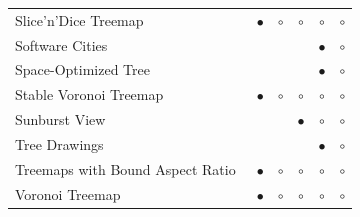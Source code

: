 \documentclass[a4paper,twoside]{article}
\newcommand*\OK{$\circ$}
\newcommand*\OKbf{$\bullet$}
\begin{document}
\begin{table}[b]
\begin{tabularx}{\linewidth}{@{}X|cccc|c@{}}
		\\ Slice'n'Dice Treemap~\cite{johnson1991-spacefilling} & \OKbf & \OK & \OK & \OK & \OK
		\\ Software Cities~\cite{steinbruckner2013-evolution} & & & & \OKbf & \OK
		\\ Space-Optimized Tree~\cite{nguyen2002-sot} & & & & \OKbf & \OK
		\\ Stable Voronoi Treemap~\cite{hahn2013-varyinghierarchies} & \OKbf & \OK & \OK & \OK & \OK
		\\ Sunburst View~\cite{stasko2000-structures} & & & \OKbf & \OK & \OK
		\\ Tree Drawings~\cite{toosi2014-circular} & & & & \OKbf & \OK
		\\ Treemaps with Bound Aspect Ratio~\cite{deBerg2011-bounded} & \OKbf & \OK & \OK & \OK & \OK
		\\ Voronoi Treemap~\cite{balzer2005-softwaremetrics} & \OKbf & \OK & \OK & \OK & \OK
		\\ \bottomrule
	\end{tabularx}
\end{table}
\end{document}

